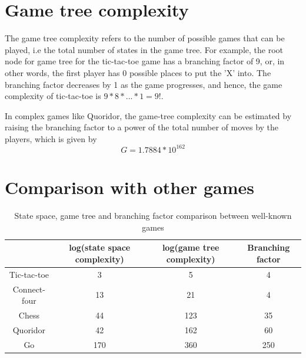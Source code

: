 \section{Game tree complexity}

The game tree complexity refers to the number of possible games that can be played, i.e the total number of states in the game tree.
For example, the root node for game tree for the tic-tac-toe game has a branching factor of 9, or, in other words, the first player has 0 possible places to put the 'X' into. The branching factor decreases by 1 as the game progresses, and hence, the game complexity of tic-tac-toe is $9 * 8 * ... * 1 = 9!$.

In complex games like Quoridor, the game-tree complexity can be estimated by raising the branching factor to a power of the total number of moves by the players, which is given by \cite{Mertens2006Quoridor}
\begin{equation}
    G =1.7884 * 10^{162}
\end{equation}

\pagebreak

\section{Comparison with other games}

\begin{table}[ht]
     \centering
     \begin{tabular}{|c|c|c|c|}\hline
          & log(state space complexity) & log(game tree complexity) & Branching factor\\ \hline 
          Tic-tac-toe  & 3   & 5   & 4    \\ \hline
          Connect-four & 13  & 21  & 4    \\ \hline
          Chess        & 44  & 123 & 35   \\ \hline
          Quoridor     & 42  & 162 & 60  \\ \hline
          Go           & 170 & 360 & 250 \\ \hline
     \end{tabular}
     \caption{State space, game tree and branching factor comparison between well-known games}
 \end{table}